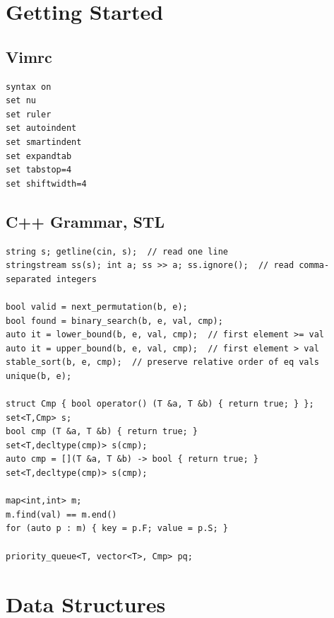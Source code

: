 \documentclass[10pt,letterpaper,landscape]{article}
\begin{document}
\begin{multicols}{2}

\tableofcontents

\newpage

\section{Getting Started}
\subsection{Vimrc}
\begin{lstlisting}
syntax on
set nu
set ruler
set autoindent
set smartindent
set expandtab
set tabstop=4
set shiftwidth=4
\end{lstlisting}
\subsection{C++ Grammar, STL}
\begin{lstlisting}
string s; getline(cin, s);  // read one line
stringstream ss(s); int a; ss >> a; ss.ignore();  // read comma-separated integers

bool valid = next_permutation(b, e);
bool found = binary_search(b, e, val, cmp);
auto it = lower_bound(b, e, val, cmp);  // first element >= val
auto it = upper_bound(b, e, val, cmp);  // first element > val
stable_sort(b, e, cmp);  // preserve relative order of eq vals
unique(b, e);

struct Cmp { bool operator() (T &a, T &b) { return true; } };
set<T,Cmp> s;
bool cmp (T &a, T &b) { return true; }
set<T,decltype(cmp)> s(cmp);
auto cmp = [](T &a, T &b) -> bool { return true; }
set<T,decltype(cmp)> s(cmp);

map<int,int> m;
m.find(val) == m.end()
for (auto p : m) { key = p.F; value = p.S; }

priority_queue<T, vector<T>, Cmp> pq;
\end{lstlisting}
\section{Data Structures}

\end{multicols}
\end{document}
